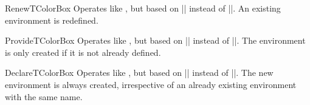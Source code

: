 \clearpage
\begin{docCommand}{RenewTColorBox}{}
  Operates like , but based on |\RenewDocumentEnvironment| instead of |\NewDocumentEnvironment|.
  An existing environment is redefined.
\end{docCommand}

\begin{docCommand}{ProvideTColorBox}{}
  Operates like , but based on |\ProvideDocumentEnvironment| instead of |\NewDocumentEnvironment|.
  The environment  is only created if it is not already defined.
\end{docCommand}

\begin{docCommand}{DeclareTColorBox}{}
  Operates like , but based on |\DeclareDocumentEnvironment| instead of |\NewDocumentEnvironment|.
  The new environment is always created, irrespective of an already existing
  environment with the same name.
\end{docCommand}


\clearpage

